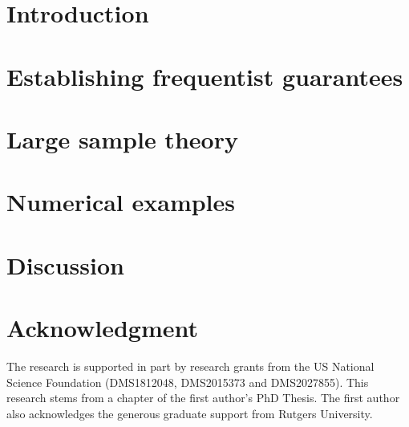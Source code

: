 \documentclass{nejsds}
\theoremstyle{remark}
\begin{document}
\begin{frontmatter}
\begin{keyword}
\end{keyword}

\end{frontmatter}
	
\section{Introduction} \label{sec:intro}
	
\section{Establishing frequentist guarantees}\label{sec:thms}
	 
\section{Large sample theory}\label{sec:largeSamp}
	
\section{Numerical examples} \label{sec:ex}

%
\section{Discussion} \label{sec:discuss}

	
\section*{Acknowledgment}
The research is supported in part by research grants from the US National Science Foundation %
(DMS1812048, DMS2015373 and DMS2027855). 
This research stems from a chapter of the first author's PhD Thesis. 
The first author also acknowledges the generous graduate support from Rutgers University.
	
\appendix

	

	
\end{document}
